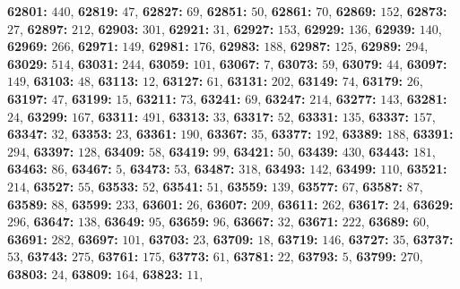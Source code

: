 \textsf{\bfseries 62801:} $440$, \textsf{\bfseries 62819:} $47$, \textsf{\bfseries 62827:} $69$, \textsf{\bfseries 62851:} $50$, \textsf{\bfseries 62861:} $70$, \textsf{\bfseries 62869:} $152$, \textsf{\bfseries 62873:} $27$, \textsf{\bfseries 62897:} $212$, \textsf{\bfseries 62903:} $301$, \textsf{\bfseries 62921:} $31$, \textsf{\bfseries 62927:} $153$, \textsf{\bfseries 62929:} $136$, \textsf{\bfseries 62939:} $140$, \textsf{\bfseries 62969:} $266$, \textsf{\bfseries 62971:} $149$, \textsf{\bfseries 62981:} $176$, \textsf{\bfseries 62983:} $188$, \textsf{\bfseries 62987:} $125$, \textsf{\bfseries 62989:} $294$, \textsf{\bfseries 63029:} $514$, \textsf{\bfseries 63031:} $244$, \textsf{\bfseries 63059:} $101$, \textsf{\bfseries 63067:} $7$, \textsf{\bfseries 63073:} $59$, \textsf{\bfseries 63079:} $44$, \textsf{\bfseries 63097:} $149$, \textsf{\bfseries 63103:} $48$, \textsf{\bfseries 63113:} $12$, \textsf{\bfseries 63127:} $61$, \textsf{\bfseries 63131:} $202$, \textsf{\bfseries 63149:} $74$, \textsf{\bfseries 63179:} $26$, \textsf{\bfseries 63197:} $47$, \textsf{\bfseries 63199:} $15$, \textsf{\bfseries 63211:} $73$, \textsf{\bfseries 63241:} $69$, \textsf{\bfseries 63247:} $214$, \textsf{\bfseries 63277:} $143$, \textsf{\bfseries 63281:} $24$, \textsf{\bfseries 63299:} $167$, \textsf{\bfseries 63311:} $491$, \textsf{\bfseries 63313:} $33$, \textsf{\bfseries 63317:} $52$, \textsf{\bfseries 63331:} $135$, \textsf{\bfseries 63337:} $157$, \textsf{\bfseries 63347:} $32$, \textsf{\bfseries 63353:} $23$, \textsf{\bfseries 63361:} $190$, \textsf{\bfseries 63367:} $35$, \textsf{\bfseries 63377:} $192$, \textsf{\bfseries 63389:} $188$, \textsf{\bfseries 63391:} $294$, \textsf{\bfseries 63397:} $128$, \textsf{\bfseries 63409:} $58$, \textsf{\bfseries 63419:} $99$, \textsf{\bfseries 63421:} $50$, \textsf{\bfseries 63439:} $430$, \textsf{\bfseries 63443:} $181$, \textsf{\bfseries 63463:} $86$, \textsf{\bfseries 63467:} $5$, \textsf{\bfseries 63473:} $53$, \textsf{\bfseries 63487:} $318$, \textsf{\bfseries 63493:} $142$, \textsf{\bfseries 63499:} $110$, \textsf{\bfseries 63521:} $214$, \textsf{\bfseries 63527:} $55$, \textsf{\bfseries 63533:} $52$, \textsf{\bfseries 63541:} $51$, \textsf{\bfseries 63559:} $139$, \textsf{\bfseries 63577:} $67$, \textsf{\bfseries 63587:} $87$, \textsf{\bfseries 63589:} $88$, \textsf{\bfseries 63599:} $233$, \textsf{\bfseries 63601:} $26$, \textsf{\bfseries 63607:} $209$, \textsf{\bfseries 63611:} $262$, \textsf{\bfseries 63617:} $24$, \textsf{\bfseries 63629:} $296$, \textsf{\bfseries 63647:} $138$, \textsf{\bfseries 63649:} $95$, \textsf{\bfseries 63659:} $96$, \textsf{\bfseries 63667:} $32$, \textsf{\bfseries 63671:} $222$, \textsf{\bfseries 63689:} $60$, \textsf{\bfseries 63691:} $282$, \textsf{\bfseries 63697:} $101$, \textsf{\bfseries 63703:} $23$, \textsf{\bfseries 63709:} $18$, \textsf{\bfseries 63719:} $146$, \textsf{\bfseries 63727:} $35$, \textsf{\bfseries 63737:} $53$, \textsf{\bfseries 63743:} $275$, \textsf{\bfseries 63761:} $175$, \textsf{\bfseries 63773:} $61$, \textsf{\bfseries 63781:} $22$, \textsf{\bfseries 63793:} $5$, \textsf{\bfseries 63799:} $270$, \textsf{\bfseries 63803:} $24$, \textsf{\bfseries 63809:} $164$, \textsf{\bfseries 63823:} $11$, 
